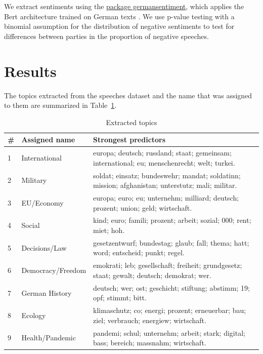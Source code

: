 \documentclass{article}
\begin{document}
We extract sentiments using the \href{https://pypi.org/project/germansentiment/}{package germansentiment}, which applies the Bert architecture trained on German texts \cite{Germansentiment}.
We use p-value testing with a binomial assumption for the distribution of negative sentiments to test for differences between parties in the proportion of negative speeches.

\section{Results}
The topics extracted from the speeches dataset and the name that was assigned to them are summarized in Table~\ref{topics_table}.
\begin{table}
  \captionsetup{width=0.9\linewidth}
  \caption{Extracted topics}
  \label{topics_table}
  \centering
  \begin{tabular}{p{0.02\linewidth} | p{0.2\linewidth} | p{0.78\linewidth}}
    \toprule
    \# & Assigned name & Strongest predictors \\
    \midrule
    1 & International & europa; deutsch; russland; staat; gemeinsam; international; eu; menschenrecht; welt; turkei. \\
    2 & Military & soldat; einsatz; bundeswehr; mandat; soldatinn; mission; afghanistan; unterstutz; mali; militar. \\
    3 & EU/Economy & europa; euro; eu; unternehm; milliard; deutsch; prozent; union; geld; wirtschaft. \\
    4 & Social & kind; euro; famili; prozent; arbeit; sozial; 000; rent; miet; hoh. \\
    5 & Decisions/Law & gesetzentwurf; bundestag; glaub; fall; thema; hatt; word; entscheid; punkt; regel. \\
    6 & Democracy/Freedom & emokrati; leb; gesellschaft; freiheit; grundgesetz; staat; gewalt; deutsch; demokrat; wer. \\
    7 & German History & deutsch; wer; ost; geschicht; stiftung; abstimm; 19; opf; stimmt; bitt. \\
    8 & Ecology & klimaschutz; co; energi; prozent; erneuerbar; bau; ziel; verbrauch; energiew; wirtschaft. \\
    9 & Health/Pandemic & pandemi; schul; unternehm; arbeit; stark; digital; bass; bereich; massnahm; wirtschaft. \\
    \bottomrule
  \end{tabular}
\end{table}
\end{document}
